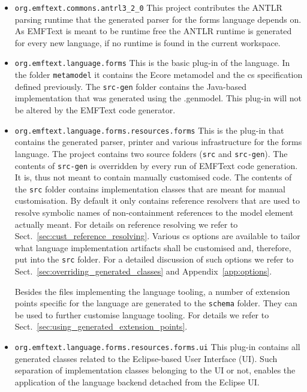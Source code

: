 	\begin{itemize} 
	  \item \texttt{org.emftext.commons.antrl3\_2\_0} This project contributes the
	  ANTLR parsing runtime that the generated parser for the forms language
	  depends on. As EMFText is meant to be runtime free the ANTLR runtime is generated
	  for every new language, if no runtime is found in the current workspace.
	  \item \texttt{org.emftext.language.forms} This is the basic plug-in of the
	  language. In the folder \texttt{metamodel} it contains the Ecore metamodel
	  and the cs specification defined previously. The \texttt{src-gen} folder contains the Java-based implementation that was
	  generated using the .genmodel. This plug-in will not be altered by the EMFText
	  code generator.
	  \item \texttt{org.emftext.language.forms.resources.forms}
	  This is the plug-in that contains the generated parser, printer and various
	  infrastructure for the forms language. The project contains two source
	  folders (\texttt{src} and \texttt{src-gen}). The contents of \texttt{src-gen}
	  is overridden by every run of EMFText code generation. It is, thus not meant
	  to contain manually customised code. The contents of the \texttt{src} folder
	  contains implementation classes that are meant for manual customisation. By
	  default it only contains reference resolvers that are used to resolve
	  symbolic names of non-containment references to the model element actually
	  meant. For details on reference resolving we refer to 
	  Sect.~\ref{sec:cust_reference_resolving}. Various cs options are available to
	  tailor what language implementation artifacts shall be customised and, therefore, 
	  put into the \texttt{src} folder. For a
	  detailed discussion of such options we refer to Sect.~\ref{sec:overriding_generated_classes} and
	  Appendix~\ref{app:options}.
	  
	  Besides the files implementing the language tooling, a number of extension
	  points specific for the language are generated to the \texttt{schema} folder. 
	  They can be used to further customise language tooling. For details we refer
	  to Sect.~\ref{sec:using_generated_extension_points}.
	  
	  \item \texttt{org.emftext.language.forms.resources.forms.ui} This plug-in 
	  contains all generated classes related to the Eclipse-based User Interface
	  (UI). Such separation of implementation classes belonging to the UI or not,
	  enables the application of the language backend detached from the Eclipse UI.
	\end{itemize}
	
